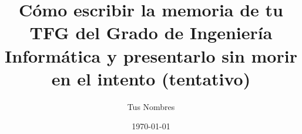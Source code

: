 \documentclass{book}
\begin{document}
\title{Cómo escribir la memoria de tu TFG del Grado de Ingeniería Informática y presentarlo sin morir en el intento (tentativo)}
\author{Tus Nombres}
\date{\today}
\maketitle

\tableofcontents
\listoftables
\listoffigures






















\end{document}

